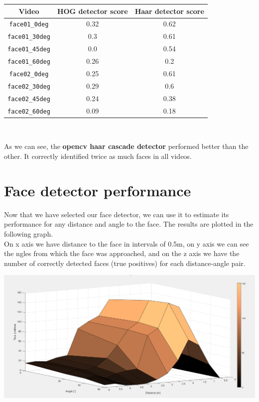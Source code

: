 \documentclass[12pt,a4paper]{article}
\begin{document}
	\begin{center}
			\begin{tabular}{|c|c|c|}
			\hline 
			Video & HOG detector score & Haar detector score \\
			\hline
			\texttt{face01\_0deg} & 0.32 & 0.62 \\
			\texttt{face01\_30deg} & 0.3 & 0.61 \\
			\texttt{face01\_45deg} & 0.0 & 0.54 \\
			\texttt{face01\_60deg} & 0.26 & 0.2 \\
			\texttt{face02\_0deg} & 0.25 & 0.61 \\
			\texttt{face02\_30deg} & 0.29 & 0.6 \\
			\texttt{face02\_45deg} & 0.24 & 0.38 \\
			\texttt{face02\_60deg} & 0.09 & 0.18 \\
			\hline 
		\end{tabular} \\
	\end{center}


	As we can see, the \textbf{opencv haar cascade detector} performed better than the other. It correctly identified twice as much faces in all videos. \\

	\section{Face detector performance}
	
	Now that we have selected our face detector, we can use it to estimate its performance for any distance and angle to the face. The results are plotted in the following graph. \\
	
	On x axis we have distance to the face in intervals of 0.5m, on y axis we can see the ngles from which the face was approached, and on the z axis we have the number of correctly detected faces (true positives) for each distance-angle pair. \\
	
	\begin{center}
		\includegraphics[width=.6\linewidth]{graf4}
	\end{center}
	
\end{document}

